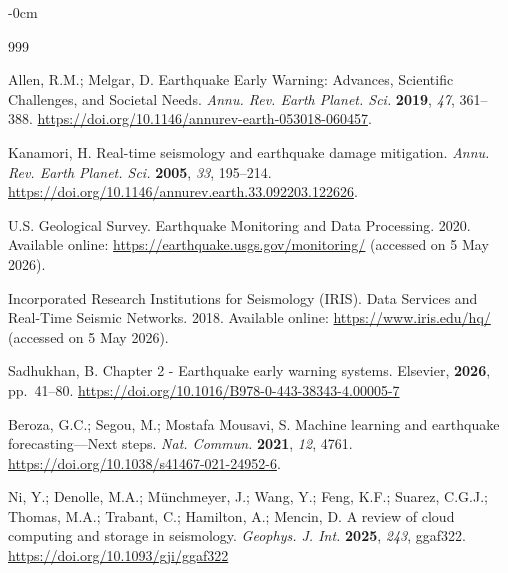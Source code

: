 \documentclass[data,article,accept,pdftex,moreauthors]{Definitions/mdpi}
\begin{document}
\begin{adjustwidth}{-\extralength}{0cm}

\begin{thebibliography}{999}

Allen, R.M.; Melgar, D. Earthquake Early Warning: Advances, Scientific Challenges, and Societal Needs. \emph{Annu. Rev. Earth Planet. Sci.} \textbf{2019}, \emph{47}, 361--388. \url{https://doi.org/10.1146/annurev-earth-053018-060457}. %

Kanamori, H. Real-time seismology and earthquake damage mitigation. \emph{Annu. Rev. Earth Planet. Sci.} \textbf{2005}, \emph{33}, 195--214. \url{https://doi.org/10.1146/annurev.earth.33.092203.122626}.

U.S. Geological Survey. Earthquake Monitoring and Data Processing. 2020. Available online: \url{https://earthquake.usgs.gov/monitoring/} (accessed on 5 May 2026).

Incorporated Research Institutions for Seismology (IRIS). Data Services and Real-Time Seismic Networks. 2018. Available online: \url{https://www.iris.edu/hq/} %
 (accessed on 5 May 2026).

Sadhukhan, B. Chapter 2 - Earthquake early warning systems. Elsevier, \textbf{2026}, pp.~41--80. \url{https://doi.org/10.1016/B978-0-443-38343-4.00005-7}

Beroza, G.C.; Segou, M.; Mostafa Mousavi, S. Machine learning and earthquake forecasting---Next steps. \emph{Nat. Commun.} \textbf{2021}, \emph{12}, 4761. \url{https://doi.org/10.1038/s41467-021-24952-6}. %

Ni, Y.; Denolle, M.A.; M{\"u}nchmeyer, J.; Wang, Y.; Feng, K.F.; Suarez, C.G.J.; Thomas, M.A.; Trabant, C.; Hamilton, A.; Mencin, D. A review of cloud computing and storage in seismology. \emph{Geophys. J. Int.} \textbf{2025}, \emph{243}, ggaf322. \url{https://doi.org/10.1093/gji/ggaf322}


\end{thebibliography}
\end{adjustwidth}
\end{document}
